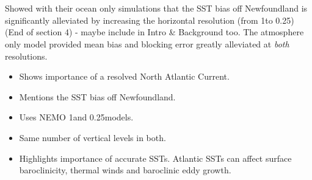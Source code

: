 \documentclass[..\Papers.tex]{subfiles}
\begin{document}
\section{\citep{Scaife2011a}}
\citep{Scaife2011a}


Showed with their ocean only simulations that the SST bias off Newfoundland is significantly alleviated by increasing the horizontal resolution (from 1\degree to 0.25\degree) (End of section 4) - maybe include in Intro \& Background too. The atmosphere only model provided mean bias and blocking error greatly alleviated at \textit{both} resolutions.


\begin{itemize}
    \item Shows importance of a resolved North Atlantic Current.
    \item Mentions the SST bias off Newfoundland.
    \item Uses NEMO 1\degree and 0.25\degree models.
    \item Same number of vertical levels in both.
    \item Highlights importance of accurate SSTs. Atlantic SSTs can affect surface baroclinicity, thermal winds and baroclinic eddy growth.
\end{itemize}
\end{document}
